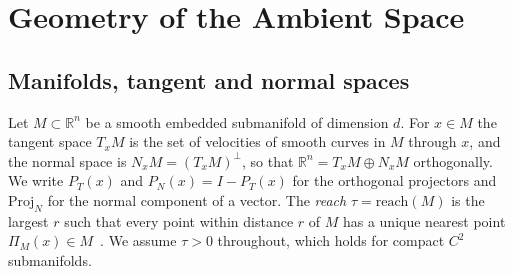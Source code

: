 \documentclass[11pt,a4paper]{article}
\theoremstyle{definition}
\theoremstyle{remark}
\newcommand{\R}{\mathbb{R}}
\newcommand{\Proj}{\mathrm{Proj}}
\newcommand{\TM}[1]{T_{#1}M}
\newcommand{\NM}[1]{N_{#1}M}
\newcommand{\reach}{\mathrm{reach}}
\begin{document}
\section{Geometry of the Ambient Space}\label{sec:geometry}

\subsection{Manifolds, tangent and normal spaces}

Let $M\subset\R^n$ be a smooth embedded submanifold of dimension $d$. For
$x\in M$ the tangent space $\TM{x}$ is the set of velocities of smooth
curves in $M$ through $x$, and the normal space is
$\NM{x}=(\TM{x})^\perp$, so that $\R^n=\TM{x}\oplus\NM{x}$ orthogonally.
We write $P_T(x)$ and $P_N(x)=I-P_T(x)$ for the orthogonal projectors and
$\Proj_{N}$ for the normal component of a vector. The \emph{reach}
$\tau=\reach(M)$ is the largest $r$ such that every point within distance
$r$ of $M$ has a unique nearest point $\Pi_M(x)\in M$~\cite{federer1959curvature}.
We assume $\tau>0$ throughout, which holds for compact $C^2$ submanifolds.
\end{document}
